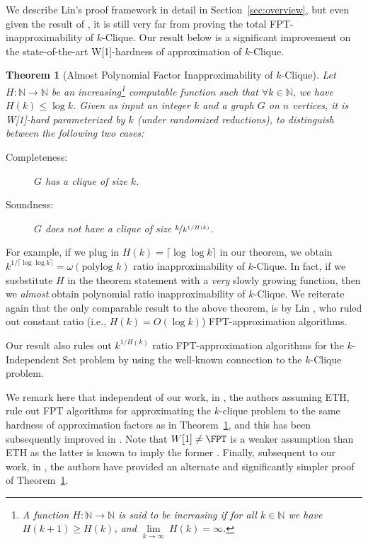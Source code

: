 \documentclass[11pt]{article}
\renewcommand{\ge}{ \geqslant}
\renewcommand{\le}{ \leqslant}
\newtheorem{theorem}{Theorem}[section]
\begin{document}
We describe Lin's proof framework in detail in Section~\ref{sec:overview}, but even given the result of \cite{L21}, it is still very far from proving the total FPT-inapproximability of $k$-Clique. Our result below is a significant improvement on the state-of-the-art W[1]-hardness of approximation of $k$-Clique. 

 

\begin{theorem}[Almost Polynomial Factor Inapproximability of $k$-Clique]\label{thm:main}
Let $H:\mathbb{N}\to\mathbb{N}$ be an increasing\footnote{\label{footnote:increasing}A function $H:\mathbb{N}\to\mathbb{N}$ is said to be increasing if for all $k\in\mathbb{N}$ we have $H(k+1)\ge H(k)$, and $\underset{k\to\infty}{\lim}\ H(k)=\infty$.} computable function such that $\forall k\in\mathbb{N}$, we have $H(k)\le \log k$. Given as input an integer $k$ and a graph $G$ on $n$ vertices, it is W[1]-hard parameterized by $k$ (under randomized reductions), to distinguish between the following two cases:
 \begin{description}
 \item[Completeness:]$G$ has a clique of size $k$.
 \item[Soundness:] $G$ does not have a clique of size $\nicefrac{k}{k^{1/H(k)}}$.
 \end{description}
\end{theorem}

For example, if we plug in $H(k)=\lceil \log\log k\rceil $  in our theorem, we obtain $k^{1/\lceil \log\log k\rceil}=\omega(\text{polylog } k)$ ratio inapproximability of $k$-Clique. In fact, if we susbstitute $H$ in the theorem statement with a \emph{very} slowly growing function, then we \emph{almost} obtain polynomial ratio inapproximability of $k$-Clique. We reiterate again that the only comparable result to the above theorem, is by Lin  \cite{L21}, who ruled out constant ratio (i.e., $H(k)=O(\log k)$) FPT-approximation algorithms.  

Our result also rules out $k^{1/H(k)}$ ratio FPT-approximation algorithms for the $k$-Independent Set problem by using the well-known connection to the $k$-Clique problem. 

We remark here that independent of our work, in \cite{LRSW21}, the authors assuming ETH, rule out FPT algorithms for approximating the $k$-clique problem to the  same hardness of approximation factors as in Theorem~\ref{thm:main}, and this has been subsequently improved in \cite{LinRSW23,GuruswamiLRS024}. Note that $W[1]\neq \FPT$ is a weaker assumption than ETH as the latter is known to imply the former \cite{CHKX06a,CHKX06b}. 
Finally, subsequent to our work, in \cite{CFLL25}, the authors have provided an alternate and significantly simpler proof of Theorem~\ref{thm:main}.
\end{document}
